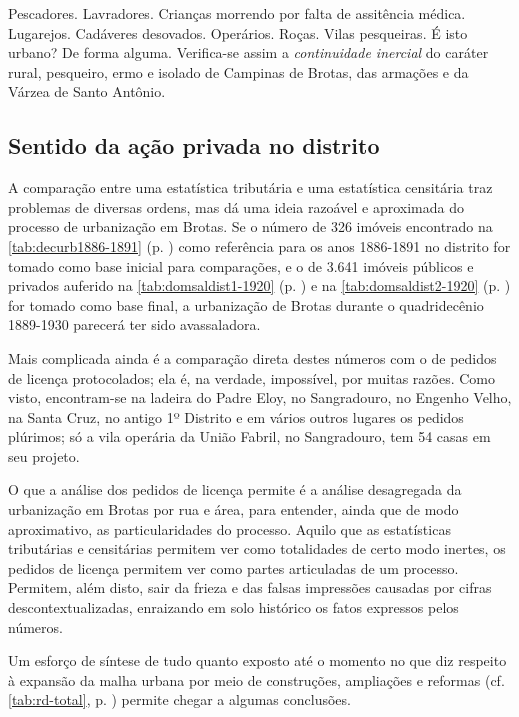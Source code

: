 Pescadores. Lavradores. Crianças morrendo por falta de assitência médica. Lugarejos. Cadáveres desovados. Operários. Roças. Vilas pesqueiras. É isto urbano? De forma alguma. Verifica-se assim a \textit{continuidade inercial} do caráter rural, pesqueiro, ermo e isolado de Campinas de Brotas, das armações e da Várzea de Santo Antônio.

\subsection{Sentido da ação privada no distrito}

A comparação entre uma estatística tributária e uma estatística censitária traz problemas de diversas ordens, mas dá uma ideia razoável e aproximada do processo de urbanização em Brotas. Se o número de 326 imóveis encontrado na \autoref{tab:decurb1886-1891} (p. \pageref{tab:decurb1886-1891}) como referência para os anos 1886-1891 no distrito for tomado como base inicial para comparações, e o de 3.641 imóveis públicos e privados auferido na \autoref{tab:domsaldist1-1920} (p. \pageref{tab:domsaldist1-1920}) e na \autoref{tab:domsaldist2-1920} (p. \pageref{tab:domsaldist2-1920}) for tomado como base final, a urbanização de Brotas durante o quadridecênio 1889-1930 parecerá ter sido avassaladora.

Mais complicada ainda é a comparação direta destes números com o de pedidos de licença protocolados; ela é, na verdade, impossível, por muitas razões. Como visto, encontram-se na ladeira do Padre Eloy, no Sangradouro, no Engenho Velho, na Santa Cruz, no antigo 1º Distrito e em vários outros lugares os pedidos plúrimos; só a vila operária da União Fabril, no Sangradouro, tem 54 casas em seu projeto.

O que a análise dos pedidos de licença permite é a análise desagregada da urbanização em Brotas por rua e área, para entender, ainda que de modo aproximativo, as particularidades do processo. Aquilo que as estatísticas tributárias e censitárias permitem ver como totalidades de certo modo inertes, os pedidos de licença permitem ver como partes articuladas de um processo. Permitem, além disto, sair da frieza e das falsas impressões causadas por cifras descontextualizadas, enraizando em solo histórico os fatos expressos pelos números.

Um esforço de síntese de tudo quanto exposto até o momento no que diz respeito à expansão da malha urbana por meio de construções, ampliações e reformas (cf. \autoref{tab:rd-total}, p. \pageref{tab:rd-total}) permite chegar a algumas conclusões.

